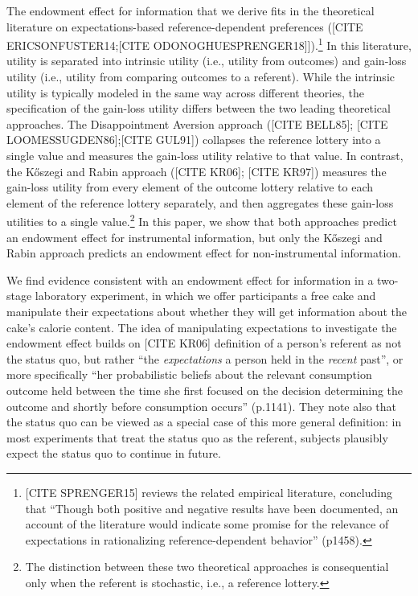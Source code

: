 \documentclass[12pt]{article}
\begin{document}
The endowment effect for information that we derive fits in the theoretical literature on expectations-based reference-dependent preferences ([CITE ERICSONFUSTER14;[CITE ODONOGHUESPRENGER18]]).\footnote{[CITE SPRENGER15] reviews the related empirical literature, concluding that \enquote{Though both positive and negative results have been documented, an account of the literature would indicate some promise for the relevance of expectations in rationalizing reference-dependent behavior} (p1458).} In this literature, utility is separated into intrinsic utility (i.e., utility from outcomes) and gain-loss utility (i.e., utility from comparing outcomes to a referent). While the intrinsic utility is typically modeled in the same way across different theories, the specification of the gain-loss utility differs between the two leading theoretical approaches. The Disappointment Aversion approach ([CITE BELL85]; [CITE LOOMESSUGDEN86];[CITE GUL91]) collapses the reference lottery into a single value and measures the gain-loss utility relative to that value. In contrast, the  Kőszegi and Rabin approach ([CITE KR06]; [CITE KR97]) measures the gain-loss utility from every element of the outcome lottery relative to each element of the reference lottery separately, and then aggregates these gain-loss utilities to a single value.\footnote{The distinction between these two theoretical approaches is consequential only when the referent is stochastic, i.e., a reference lottery.}  In this paper, we show that both approaches predict an endowment effect for instrumental information, but only the Kőszegi and Rabin approach predicts an endowment effect for non-instrumental information.

We find evidence consistent with an endowment effect for information in a two-stage laboratory experiment, in which we offer participants a free cake and manipulate their expectations about whether they will get information about the cake’s calorie content. The idea of manipulating expectations to investigate the endowment effect builds on [CITE KR06] definition of a person’s referent as not the status quo, but rather \enquote{the \emph{expectations} a person held in the \emph{recent} past}, or more specifically \enquote{her probabilistic beliefs about the relevant consumption outcome held between the time she first focused on the decision determining the outcome and shortly before consumption occurs} (p.1141). They note also that the status quo can be viewed as a special case of this more general definition: in most experiments that treat the status quo as the referent, subjects plausibly expect the status quo to continue in future.
\end{document}
